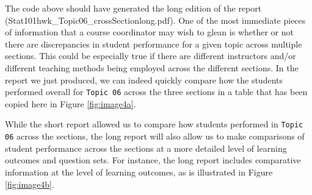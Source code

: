 \documentclass{article}\usepackage[]{graphicx}\usepackage[]{color}
\numberwithin{equation}{section} %
\begin{document}
The code above should have generated the long edition of the report (Stat101hwk\_Topic06\_crossSection\-long.pdf). One of the most immediate pieces of information that a course coordinator may wish to glean is whether or not there are discrepancies in student performance for a given topic across multiple sections. This could be especially true if there are different instructors and/or different teaching methods being employed across the different sections. In the report we just produced, we can indeed quickly compare how the students performed overall for \texttt{Topic 06} across the three sections in a table that has been copied here in Figure \ref{fig:image4a}.

\begin{center}
\captionsetup{width=0.65\textwidth}
\label{fig:image4a}
\end{center}

While the short report allowed us to compare how students performed in \texttt{Topic 06} across the sections, the long report will also allow us to make comparisons of student performance across the sections at a more detailed level of learning outcomes and question sets. For instance, the long report includes comparative information at the level of learning outcomes, as is illustrated in Figure \ref{fig:image4b}.
\end{document}

